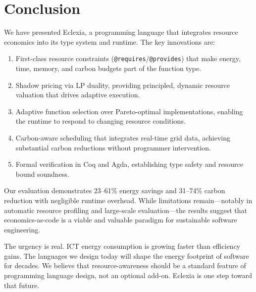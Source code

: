 \documentclass[11pt,a4paper]{article}
\begin{document}
\section{Conclusion}
\label{sec:conclusion}

We have presented Eclexia, a programming language that integrates resource
economics into its type system and runtime.  The key innovations are:

\begin{enumerate}
  \item First-class resource constraints (\texttt{@requires}/\texttt{@provides})
    that make energy, time, memory, and carbon budgets part of the function
    type.

  \item Shadow pricing via LP duality, providing principled, dynamic resource
    valuation that drives adaptive execution.

  \item Adaptive function selection over Pareto-optimal implementations,
    enabling the runtime to respond to changing resource conditions.

  \item Carbon-aware scheduling that integrates real-time grid data, achieving
    substantial carbon reductions without programmer intervention.

  \item Formal verification in Coq and Agda, establishing type safety and
    resource bound soundness.
\end{enumerate}

Our evaluation demonstrates 23--61\% energy savings and 31--74\% carbon
reduction with negligible runtime overhead.  While limitations remain---notably
in automatic resource profiling and large-scale evaluation---the results
suggest that economics-as-code is a viable and valuable paradigm for
sustainable software engineering.

The urgency is real.  ICT energy consumption is growing faster than efficiency
gains.  The languages we design today will shape the energy footprint of
software for decades.  We believe that resource-awareness should be a standard
feature of programming language design, not an optional add-on.  Eclexia
is one step toward that future.



\end{document}
